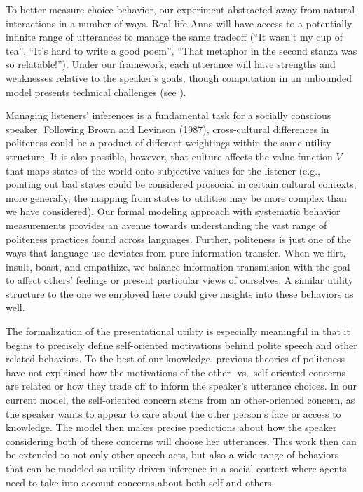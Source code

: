 \documentclass[12pt]{article}
\begin{document}

To better measure choice behavior, our experiment abstracted away from
natural interactions in a number of ways. Real-life Anns will have
access to a potentially infinite range of utterances to manage the same
tradeoff (\enquote{It wasn't my cup of tea}, \enquote{It's hard to write
a good poem}, \enquote{That metaphor in the second stanza was so
relatable!}). Under our framework, each utterance will have strengths
and weaknesses relative to the speaker's goals, though computation in an
unbounded model presents technical challenges (see \cite{goodman2016}).

Managing listeners' inferences is a fundamental task for a socially
conscious speaker. Following Brown and Levinson (1987), cross-cultural
differences in politeness could be a product of different weightings
within the same utility structure. It is also possible, however, that
culture affects the value function \(V\) that maps states of the world
onto subjective values for the listener (e.g., pointing out bad states
could be considered prosocial in certain cultural contexts; more
generally, the mapping from states to utilities may be more complex than
we have considered). Our formal modeling approach with systematic
behavior measurements provides an avenue towards understanding the vast
range of politeness practices found across languages. Further,
politeness is just one of the ways that language use deviates from pure
information transfer. When we flirt, insult, boast, and empathize, we
balance information transmission with the goal to affect others'
feelings or present particular views of ourselves. A similar utility
structure to the one we employed here could give insights into these
behaviors as well.

The formalization of the presentational utility is especially meaningful
in that it begins to precisely define self-oriented motivations behind
polite speech and other related behaviors. To the best of our knowledge,
previous theories of politeness have not explained how the motivations
of the other- vs.~self-oriented concerns are related or how they trade
off to inform the speaker's utterance choices. In our current model, the
self-oriented concern stems from an other-oriented concern, as the
speaker wants to appear to care about the other person's face or access
to knowledge. The model then makes precise predictions about how the
speaker considering both of these concerns will choose her utterances.
This work then can be extended to not only other speech acts, but also a
wide range of behaviors that can be modeled as utility-driven inference
in a social context \cite{baker2017rational, hamlin2013mentalistic} where agents need to
take into account concerns about both self and others.
\end{document}
